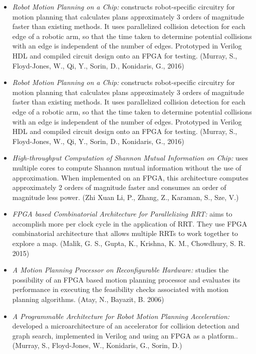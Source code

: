 \documentclass[11pt, oneside]{article}   	%
\begin{document}
\begin{itemize}
    \item \textit{Robot Motion Planning on a Chip:} constructs robot-specific circuitry for motion planning that calculates plans approximately 3 orders of magnitude faster than existing methods. It uses parallelized collision detection for each edge of a robotic arm, so that the time taken to determine potential collisions with an edge is independent of the number of edges. Prototyped in Verilog HDL and compiled circuit design onto an FPGA for testing. (Murray, S., Floyd-Jones, W., Qi, Y., Sorin, D., Konidaris, G., 2016) 

    \item \textit{Robot Motion Planning on a Chip:} constructs robot-specific circuitry for motion planning that calculates plans approximately 3 orders of magnitude faster than existing methods. It uses parallelized collision detection for each edge of a robotic arm, so that the time taken to determine potential collisions with an edge is independent of the number of edges. Prototyped in Verilog HDL and compiled circuit design onto an FPGA for testing. (Murray, S., Floyd-Jones, W., Qi, Y., Sorin, D., Konidaris, G., 2016) 

    \item \textit{High-throughput Computation of Shannon Mutual Information on Chip:} uses multiple cores to compute Shannon mutual information without the use of approximation. When implemented on an FPGA, this architecture computes approximately 2 orders of magnitude faster and consumes an order of magnitude less power. (Zhi Xuan Li, P., Zhang, Z., Karaman, S., Sze, V.)

    \item \textit{FPGA based Combinatorial Architecture for Parallelizing RRT:} aims to accomplish more per clock cycle in the application of RRT. They use FPGA combinatorial architecture that allows multiple RRTs to work together to explore a map. (Malik, G. S., Gupta, K., Krishna, K. M., Chowdhury, S. R. 2015)


    \item \textit{A Motion Planning Processor on Reconfigurable Hardware:} studies the possibility of an FPGA based motion planning processor and evaluates its performance in executing the feasibility checks associated with motion planning algorithms. (Atay, N., Bayazit, B. 2006)


    \item \textit{A Programmable Architecture for Robot Motion Planning Acceleration:} developed a microarchitecture of an accelerator for collision detection and graph search, implemented in Verilog and using an FPGA as a platform.. (Murray, S., Floyd-Jones, W., Konidaris, G., Sorin, D.)



\end{itemize}
\end{document}
